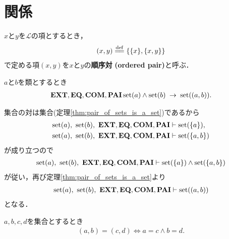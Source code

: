 \section{関係}
	\begin{screen}
		\begin{dfn}[順序対]
			$x$と$y$を$\mathcal{L}$の項とするとき，
			\begin{align}
				(x,y) \defeq \{\{x\},\{x,y\}\}
			\end{align}
			で定める項$(x,y)$を$x$と$y$の{\bf 順序対}
			{\bf (ordered pair)}と呼ぶ．
		\end{dfn}
	\end{screen}
	
	\begin{screen}
		\begin{thm}[集合の順序対は集合]
		\label{thm:ordered_pair_of_sets_is_a_set}
			$a$と$b$を類とするとき
			\begin{align}
				\mbox{{\bf EXT}},\mbox{{\bf EQ}},\mbox{\bf COM},\mbox{{\bf PAI}} 
				\operatorname*{set} (a) \wedge \operatorname*{set} (b) \hspace{0.25em}\rightarrow\hspace{0.25em} \operatorname*{set} ((a,b)).
			\end{align}
		\end{thm}
	\end{screen}
	
	\begin{prf}
		集合の対は集合(定理\ref{thm:pair_of_sets_is_a_set})であるから
		\begin{align}
			\operatorname*{set} (a),\ \operatorname*{set} (b),\ \mbox{{\bf EXT}},\mbox{{\bf EQ}},\mbox{\bf COM},\mbox{{\bf PAI}} &\vdash \operatorname*{set} (\{a\}), \\
			\operatorname*{set} (a),\ \operatorname*{set} (b),\ \mbox{{\bf EXT}},\mbox{{\bf EQ}},\mbox{\bf COM},\mbox{{\bf PAI}} &\vdash \operatorname*{set} (\{a,b\})
		\end{align}
		が成り立つので
		\begin{align}
			\operatorname*{set} (a),\ \operatorname*{set} (b),\ \mbox{{\bf EXT}},\mbox{{\bf EQ}},\mbox{\bf COM},\mbox{{\bf PAI}} \vdash 
			\operatorname*{set} (\{a\}) \wedge \operatorname*{set} (\{a,b\})
		\end{align}
		が従い，再び定理\ref{thm:pair_of_sets_is_a_set}より
		\begin{align}
			\operatorname*{set} (a),\ \operatorname*{set} (b),\ \mbox{{\bf EXT}},\mbox{{\bf EQ}},\mbox{\bf COM},\mbox{{\bf PAI}} \vdash \operatorname*{set} ((a,b))
		\end{align}
		となる．
		\QED
	\end{prf}
	
	\begin{screen}
		\begin{thm}[順序対の相等性]
		\label{thm:equality_of_ordered_pairs}
			$a,b,c,d$を集合とするとき
			\begin{align}
				(a,b) = (c,d) \Longleftrightarrow a=c \wedge b=d.
			\end{align}
		\end{thm}
	\end{screen}
	

